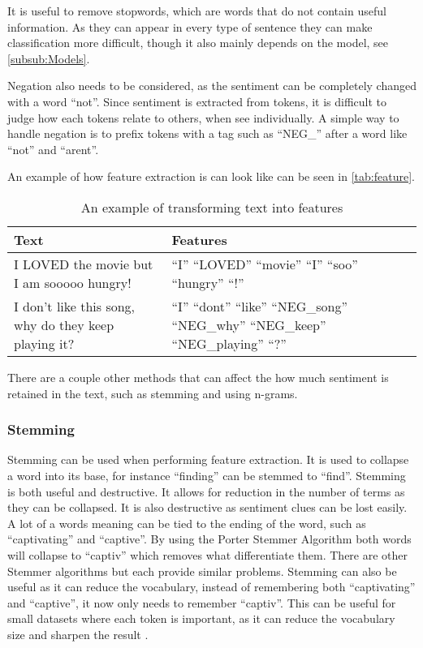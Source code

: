 It is useful to remove stopwords, which are words that do not contain useful
information. As they can appear in every type of sentence they can make
classification more difficult, though it also mainly depends on the model,
see \autoref{subsub:Models}.\nl

Negation also needs to be considered, as the sentiment can be completely changed
with a word ``not''. Since sentiment is extracted from tokens, it is difficult
to judge how each tokens relate to others, when see individually. A simple way
to handle negation is to prefix tokens with a tag such as ``NEG\_'' after a
word like ``not'' and ``arent''.\nl

An example of how feature extraction is can look like can be seen in
\autoref{tab:feature}.

\begin{table}[H]
\centering
\begin{tabular}{|p{6cm}|p{8cm}|}
\hline
Text & Features \\ \hline
I LOVED the movie but I am sooooo hungry! & 
``I'' ``LOVED'' ``movie'' ``I'' ``soo'' ``hungry'' ``!''
\\ \hline 
I don't like this song, why do they keep playing it? &
``I'' ``dont'' ``like'' ``NEG\_song'' ``NEG\_why'' ``NEG\_keep'' ``NEG\_playing''
``?'' \\ \hline
\end{tabular}
\caption{An example of transforming text into features}
\label{tab:feature}
\end{table}

There are a couple other methods that can affect the how much sentiment is
retained in the text, such as stemming and using n-grams.

\subsubsection{Stemming}
Stemming can be used when performing feature extraction. It is used to collapse
a word into its base, for instance ``finding'' can be stemmed to ``find''.
Stemming is both useful and destructive. It allows for reduction in the number
of terms as they can be collapsed. It is also destructive as sentiment clues
can be lost easily. A lot of a words meaning can be tied to the ending of the
word, such as ``captivating'' and ``captive''. By using the Porter Stemmer
Algorithm both words will collapse to ``captiv'' which removes what
differentiate them. There are other Stemmer algorithms but each provide similar
problems. Stemming can also be useful as it can reduce the vocabulary, instead
of remembering both ``captivating'' and ``captive'', it now only needs to
remember ``captiv''. This can be useful for small datasets where each token is
important, as it can reduce the vocabulary size and sharpen the result
\citep[Ch 3.b]{Sentiment}.

